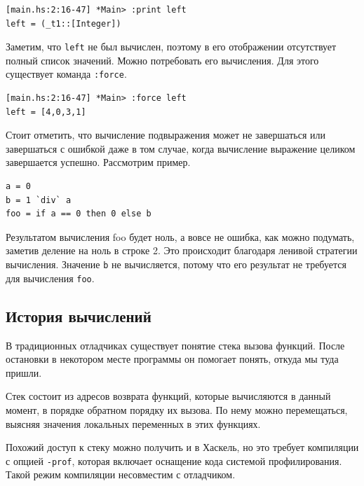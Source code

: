 \documentclass[fontsize=14pt, paper=a4, pagesize, DIV=calc]{scrartcl}
\def\code#1{\texttt{#1}}
\begin{document}
\begin{ListingEnv}
\caption{}
\begin{lstlisting}[numbers=none]
[main.hs:2:16-47] *Main> :print left
left = (_t1::[Integer])
\end{lstlisting}
\end{ListingEnv}

Заметим, что \code{left} не был вычислен, поэтому в его отображении отсутствует
полный список значений. Можно потребовать его вычисления. Для этого существует
команда \code{:force}. 

\begin{ListingEnv}
\caption{}
\begin{lstlisting}[numbers=none]
[main.hs:2:16-47] *Main> :force left
left = [4,0,3,1]
\end{lstlisting}
\end{ListingEnv}

Стоит отметить, что вычисление подвыражения может не завершаться или
завершаться с ошибкой даже в том случае, когда вычисление выражение целиком
завершается успешно. Рассмотрим пример.

\begin{ListingEnv}
\caption{main.hs}
\begin{lstlisting}
a = 0
b = 1 `div` a
foo = if a == 0 then 0 else b
\end{lstlisting}
\end{ListingEnv}

Результатом вычисления foo будет ноль, а вовсе не ошибка, как можно подумать,
заметив деление на ноль в строке 2. Это происходит благодаря ленивой стратегии
вычисления. Значение \code{b} не вычисляется, потому что его результат не
требуется для вычисления \code{foo}.

\subsection{История вычислений}

В традиционных отладчиках существует понятие стека вызова функций. После
остановки в некотором месте программы он помогает понять, откуда мы туда
пришли. 

Стек состоит из адресов возврата функций, которые вычисляются в данный момент,
в порядке обратном порядку их вызова. По нему можно перемещаться, выясняя
значения локальных переменных в этих функциях.

Похожий доступ к стеку можно получить и в Хаскель, но это требует компиляции с
опцией \code{-prof}, которая включает оснащение кода системой профилирования.
Такой режим компиляции несовместим с отладчиком. 
\end{document}
